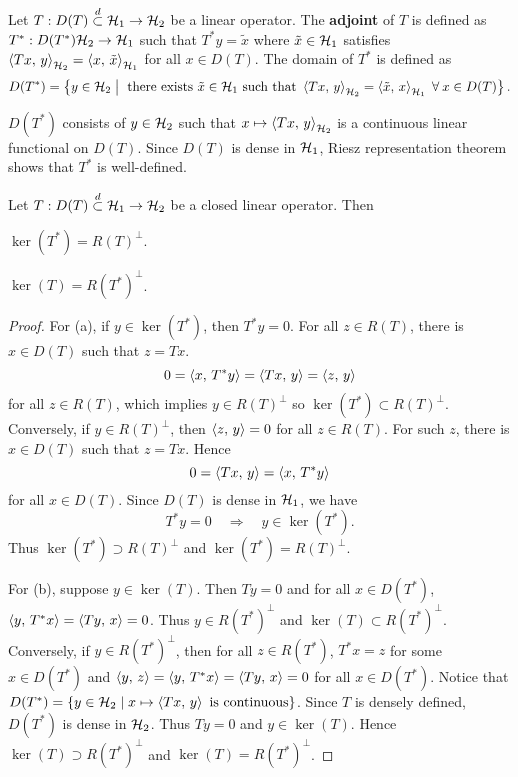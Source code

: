 \begin{definition}
    Let $T:D(T)\overset{d}{\subset}\mathcal{H}_1\to\mathcal{H}_2$ be a linear operator. The \textbf{adjoint} of $T$ 
    is defined as $T^*:D(T^*)\mathcal{H}_2\to\mathcal{H}_1$ such that $T^*y = \tilde{x}$ where 
    $\tilde{x}\in\mathcal{H}_1$ satisfies $\left\langle {Tx},\, {y} \right\rangle_{\mathcal{H}_2} = \left\langle {x},\, {\tilde{x}} \right\rangle_{\mathcal{H}_1}$ for all 
    $x\in D(T)$. The domain of $T^*$ is defined as 
    \begin{equation*}
        D(T^*) = \left\{ y\in\mathcal{H}_2 \;\middle\vert\; \text{ there exists }\tilde{x}\in\mathcal{H}_1 \text{ such that }\left\langle {Tx},\, {y} \right\rangle_{\mathcal{H}_2} = \left\langle {\tilde{x}},\, {x} \right\rangle_{\mathcal{H}_1}\;\forall\: x\in D(T) \right\}.
    \end{equation*}
\end{definition}
\begin{remark}
    $D(T^*)$ consists of $y\in\mathcal{H}_2$ such that $x\mapsto\left\langle {Tx},\, {y} \right\rangle_{\mathcal{H}_2}$ is a continuous 
    linear functional on $D(T)$. Since $D(T)$ is dense in $\mathcal{H}_1$, Riesz representation theorem 
    shows that $T^*$ is well-defined. 
\end{remark}

\begin{proposition}
    Let $T:D(T)\overset{d}{\subset}\mathcal{H}_1\to\mathcal{H}_2$ be a closed linear operator. Then 
    \begin{thmenum}
        \item $\ker(T^*) = R(T)^\perp$. 
        \item $\ker(T) = R(T^*)^\perp$.
    \end{thmenum}
\end{proposition}
\begin{proof}
    For (a), if $y\in\ker(T^*)$, then $T^*y = 0$. For all $z\in R(T)$, 
    there is $x\in D(T)$ such that $z = Tx$. 
    \begin{equation*}
        0 = \left\langle {x},\, {T^*y} \right\rangle = \left\langle {Tx},\, {y} \right\rangle = \left\langle {z},\, {y} \right\rangle
    \end{equation*}
    for all $z\in R(T)$, which implies $y\in R(T)^\perp$ so 
    $\ker(T^*) \subset R(T)^\perp$. Conversely, if $y\in R(T)^\perp$, 
    then $\left\langle {z},\, {y} \right\rangle = 0$ for all $z\in R(T)$. For such $z$, there 
    is $x\in D(T)$ such that $z = Tx$. Hence
    \begin{equation*}
        0 = \left\langle {Tx},\, {y} \right\rangle = \left\langle {x},\, {T^*y} \right\rangle
    \end{equation*}
    for all $x\in D(T)$. Since $D(T)$ is dense in $\mathcal{H}_1$, we have 
    \begin{equation*}
        T^*y = 0 \quad \Rightarrow\quad y\in\ker(T^*).
    \end{equation*}
    Thus $\ker(T^*) \supset R(T)^\perp$ and $\ker(T^*) = R(T)^\perp$. 

    For (b), suppose $y\in\ker(T)$. Then $Ty = 0$ and for all 
    $x\in D(T^*)$, $\left\langle {y},\, {T^*x} \right\rangle = \left\langle {Ty},\, {x} \right\rangle = 0$. Thus 
    $y\in R(T^*)^\perp$ and $\ker(T) \subset R(T^*)^\perp$. 
    Conversely, if $y\in R(T^*)^\perp$, then for all $z\in R(T^*)$, 
    $T^*x = z$ for some $x\in D(T^*)$ and $\left\langle {y},\, {z} \right\rangle = \left\langle {y},\, {T^*x} \right\rangle 
    = \left\langle {Ty},\, {x} \right\rangle = 0$ for all $x\in D(T^*)$. Notice that 
    $D(T^*) = \left\{ y\in\mathcal{H}_2 \;\middle\vert\; x\mapsto\left\langle {Tx},\, {y} \right\rangle \text{ is continuous} \right\}$. 
    Since $T$ is densely defined, $D(T^*)$ is dense in $\mathcal{H}_2$. 
    Thus $Ty = 0$ and $y\in\ker(T)$. Hence 
    $\ker(T) \supset R(T^*)^\perp$ and $\ker(T) = R(T^*)^\perp$.
\end{proof}

